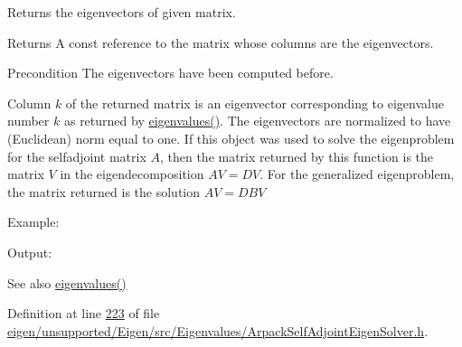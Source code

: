 Returns the eigenvectors of given matrix. 

\begin{DoxyReturn}{Returns}
A const reference to the matrix whose columns are the eigenvectors.
\end{DoxyReturn}
\begin{DoxyPrecond}{Precondition}
The eigenvectors have been computed before.
\end{DoxyPrecond}
Column $ k $ of the returned matrix is an eigenvector corresponding to eigenvalue number $ k $ as returned by \hyperlink{class_eigen_1_1_arpack_generalized_self_adjoint_eigen_solver_ab46900dafdd11a8ac05a662c6b41480d}{eigenvalues()}. The eigenvectors are normalized to have (Euclidean) norm equal to one. If this object was used to solve the eigenproblem for the selfadjoint matrix $ A $, then the matrix returned by this function is the matrix $ V $ in the eigendecomposition $ A V = D V $. For the generalized eigenproblem, the matrix returned is the solution $ A V = D B V $

Example\+: 
\begin{DoxyCodeInclude}
\end{DoxyCodeInclude}
 Output\+: 
\begin{DoxyVerbInclude}
\end{DoxyVerbInclude}


\begin{DoxySeeAlso}{See also}
\hyperlink{class_eigen_1_1_arpack_generalized_self_adjoint_eigen_solver_ab46900dafdd11a8ac05a662c6b41480d}{eigenvalues()} 
\end{DoxySeeAlso}


Definition at line \hyperlink{eigen_2unsupported_2_eigen_2src_2_eigenvalues_2_arpack_self_adjoint_eigen_solver_8h_source_l00223}{223} of file \hyperlink{eigen_2unsupported_2_eigen_2src_2_eigenvalues_2_arpack_self_adjoint_eigen_solver_8h_source}{eigen/unsupported/\+Eigen/src/\+Eigenvalues/\+Arpack\+Self\+Adjoint\+Eigen\+Solver.\+h}.

\mbox{\label{class_eigen_1_1_arpack_generalized_self_adjoint_eigen_solver_a183825135568364792a955efc55a0773}} 
